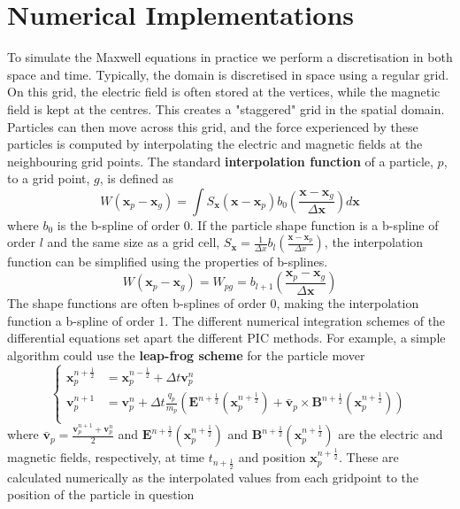 \section{Numerical Implementations}
To simulate the Maxwell equations in practice we perform a discretisation in both space and time. Typically, the domain is discretised in space using a regular grid. On this grid, the electric field is often stored at the vertices, while the magnetic field is kept at the centres. This creates a "staggered" grid in the spatial domain. Particles can then move across this grid, and the force experienced by these particles is computed by interpolating the electric and magnetic fields at the neighbouring grid points. The standard \textbf{interpolation function} of a particle, $p$, to a grid point, $g$, is defined as 
\begin{equation}
    W(\textbf{x}_p - \textbf{x}_g) = \int S_{\textbf{x}}(\textbf{x}-\textbf{x}_p)b_0\left(\frac{\textbf{x}-\textbf{x}_g}{\Delta\textbf{x}}\right) d\textbf{x}
\end{equation}
where $b_0$ is the b-spline of order 0. If the particle shape function is a b-spline of order $l$ and the same size as a grid cell, $S_\textbf{x} = \frac{1}{\Delta x}b_l\left(\frac{\textbf{x}-\textbf{x}_p}{\Delta x}\right)$, the interpolation function can be simplified using the properties of b-splines.
\begin{equation}
  W(\textbf{x}_p - \textbf{x}_g) = W_{pg} = b_{l+1}\left(\frac{\textbf{x}_p-\textbf{x}_g}{\Delta \textbf{x}}\right)  
\end{equation}
The shape functions are often b-splines of order 0, making the interpolation function a b-spline of order 1. 
The different numerical integration schemes of the differential equations set apart the different PIC methods. For example, a simple algorithm could use the \textbf{leap-frog scheme} for the particle mover
\begin{equation}
\left\{\begin{aligned} 
	\textbf{x}_p^{n+\frac{1}{2}} &= \textbf{x}_p^{n-\frac{1}{2}} + \Delta t \textbf{v}_p^{n} \\
	\textbf{v}_p^{n+1} &= \textbf{v}_p^{n} + \Delta t \frac{q_p}{m_p}\left(\textbf{E}^{n+\frac{1}{2}}(\textbf{x}_p^{n+\frac{1}{2}}) + \bar{\textbf{v}}_p \times \textbf{B}^{n+\frac{1}{2}}(\textbf{x}_p^{n+\frac{1}{2}})\right)\\
\end{aligned}\right.
\end{equation}
where $\bar{\textbf{v}}_p=\frac{\textbf{v}_p^{n+1}+\textbf{v}_p^{n}}{2}$ and $\textbf{E}^{n+\frac{1}{2}}(\textbf{x}_p^{n+\frac{1}{2}})$ and $\textbf{B}^{n+\frac{1}{2}}(\textbf{x}_p^{n+\frac{1}{2}})$ are the electric and magnetic fields, respectively, at time $t_{n+\frac{1}{2}}$ and position $\textbf{x}_p^{n+\frac{1}{2}}$. These are calculated numerically as the interpolated values from each gridpoint to the position of the particle in question
